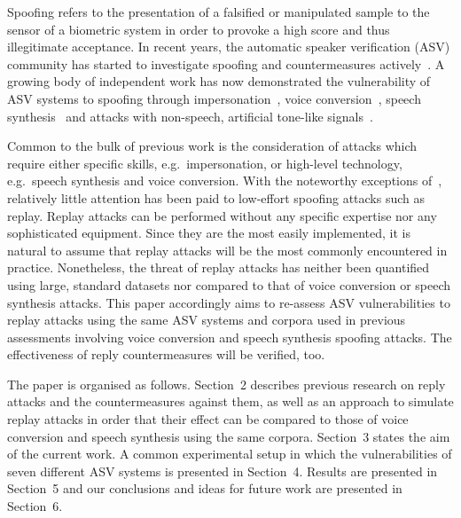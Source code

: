 Spoofing refers to the presentation of a falsified or manipulated sample 
to the sensor of a biometric system in order to provoke a high score and 
thus illegitimate acceptance.
In recent years, the automatic speaker verification (ASV) community has 
started to investigate spoofing and countermeasures 
actively~\cite{interspeechSpecialSession, handbookChapter}.  A growing 
body of independent work has now demonstrated the vulnerability of ASV 
systems to spoofing through 
impersonation~\cite{Blomberg2004,Farrus2008}, voice 
conversion~\cite{Perrot2005, Bonastre2007}, speech 
synthesis~\cite{Masuko1999, Leon2010} and attacks with non-speech, 
artificial tone-like signals~\cite{Alegre2012b}.

Common to the bulk of previous work is the consideration of attacks 
which require either specific skills, e.g.~impersonation, or high-level 
technology, e.g.~speech synthesis and voice conversion. With the 
noteworthy exceptions of~\cite{Lindberg1999,Villalba2010}, relatively 
little attention has been paid to low-effort spoofing attacks such as 
replay.  Replay attacks can be performed without any specific expertise 
nor any sophisticated equipment.  Since they are the most easily 
implemented, it is natural to assume that replay attacks will be the 
most commonly encountered in practice.  Nonetheless, the threat of 
replay attacks has neither been quantified using large, standard 
datasets nor compared to that of voice conversion or speech synthesis 
attacks.  This paper accordingly aims to re-assess ASV vulnerabilities 
to replay attacks using the same ASV systems and corpora used in 
previous assessments involving voice conversion and speech synthesis 
spoofing attacks. The effectiveness of reply countermeasures will be verified, too.  

The paper is organised as follows.  Section~2 describes previous research on reply attacks and the countermeasures against them, as well as an approach to 
simulate replay attacks in order that their effect can be compared to 
those of voice conversion and speech synthesis using the same corpora. Section~3 states the aim of the current work. A common experimental setup in which the vulnerabilities of seven different ASV systems is presented in Section~4. Results are presented in Section~5 and our conclusions and ideas for future work are presented in Section~6.
